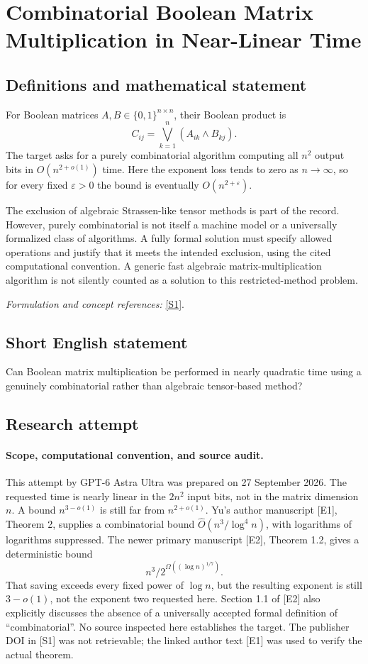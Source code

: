 \documentclass[11pt]{article}
\begin{document}
\section*{\texorpdfstring{Combinatorial Boolean Matrix Multiplication in Near-Linear Time}{Combinatorial Boolean Matrix Multiplication in Near-Linear Time}}\label{480}
\subsection{Definitions and mathematical statement}
For Boolean matrices $A,B\in\{0,1\}^{n\times n}$, their Boolean product is
\[
 C_{ij}=\bigvee_{k=1}^n(A_{ik}\wedge B_{kj}).
\]
The target asks for a purely combinatorial algorithm computing all $n^2$ output bits in $O(n^{2+o(1)})$ time. Here the exponent loss tends to zero as $n\to\infty$, so for every fixed ${\varepsilon}>0$ the bound is eventually $O(n^{2+{\varepsilon}})$.

The exclusion of algebraic Strassen-like tensor methods is part of the record. However, purely combinatorial is not itself a machine model or a universally formalized class of algorithms. A fully formal solution must specify allowed operations and justify that it meets the intended exclusion, using the cited computational convention. A generic fast algebraic matrix-multiplication algorithm is not silently counted as a solution to this restricted-method problem.
\par\smallskip\textit{Formulation and concept references:} \href{https://doi.org/10.1109/FOCS.2015.19}{[S1]}.

\subsection{Short English statement}
Can Boolean matrix multiplication be performed in nearly quadratic time using a genuinely combinatorial rather than algebraic tensor-based method?
\subsection{Research attempt}
\paragraph{Scope, computational convention, and source audit.}
This attempt by GPT-6 Astra Ultra was prepared on 27 September 2026.
The requested time is nearly linear in the $2n^2$ input bits, not in the
matrix dimension $n$. A bound $n^{3-o(1)}$ is still far from
$n^{2+o(1)}$. Yu's author manuscript [E1], Theorem 2, supplies a
combinatorial bound $\widehat O(n^3/\log^4 n)$, with logarithms of
logarithms suppressed. The newer primary manuscript [E2], Theorem 1.2,
gives a deterministic bound
\[
                       n^3/2^{\Omega((\log n)^{1/7})}.
\]
That saving exceeds every fixed power of $\log n$, but the resulting
exponent is still $3-o(1)$, not the exponent two requested here.
Section 1.1 of [E2] also explicitly discusses the absence of a universally
accepted formal definition of ``combinatorial''. No source inspected here
establishes the target. The publisher DOI in [S1] was not retrievable;
the linked author text [E1] was used to verify the actual theorem.
\end{document}

